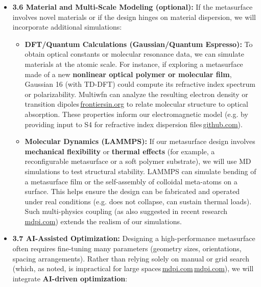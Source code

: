 \documentclass[11pt]{article}
\begin{document}
\begin{itemize}
\begin{itemize}[leftmargin=2em]
  \end{itemize}
  \item \textbf{3.6 Material and Multi-Scale Modeling (optional):} If the metasurface involves novel materials or if the design hinges on material dispersion, we will incorporate additional simulations:
  \begin{itemize}[leftmargin=2em]
    \item \textbf{DFT/Quantum Calculations (Gaussian/Quantum Espresso):} To obtain optical constants or molecular resonance data, we can simulate materials at the atomic scale. For instance, if exploring a metasurface made of a new \textbf{nonlinear optical polymer or molecular film}, Gaussian 16 (with TD-DFT) could compute its refractive index spectrum or polarizability. Multiwfn can analyze the resulting electron density or transition dipoles\,\href{https://www.frontiersin.org/journals/bioengineering-and-biotechnology/articles/10.3389/fbioe.2023.1219042/full#:~:text=Progress%20in%20application%20of%20terahertz,walled%20carbon%20nanotube%20film}{frontiersin.org} to relate molecular structure to optical absorption. These properties inform our electromagnetic model (e.g. by providing input to S4 for refractive index dispersion files\,\href{https://github.com/hzzg0727/Metasurface-Design#:~:text=material}{github.com}).
    \item \textbf{Molecular Dynamics (LAMMPS):} If our metasurface design involves \textbf{mechanical flexibility} or \textbf{thermal effects} (for example, a reconfigurable metasurface or a soft polymer substrate), we will use MD simulations to test structural stability. LAMMPS can simulate bending of a metasurface film or the self-assembly of colloidal meta-atoms on a surface. This helps ensure the design can be fabricated and operated under real conditions (e.g. does not collapse, can sustain thermal loads). Such multi-physics coupling (as also suggested in recent research\,\href{https://www.mdpi.com/2304-6732/12/10/947#:~:text=diverse%2C%20rapid%2C%20and%20precise%2C%20simplifying,previously%20complex%20inverse%20design%20process}{mdpi.com}) extends the realism of our simulations.
  \end{itemize}
  \item \textbf{3.7 AI-Assisted Optimization:} Designing a high-performance metasurface often requires fine-tuning many parameters (geometry sizes, orientations, spacing arrangements). Rather than relying solely on manual or grid search (which, as noted, is impractical for large spaces\,\href{https://www.mdpi.com/2304-6732/12/10/947#:~:text=Traditional%20metasurface%20design%20methods%20mainly,simulate%20and%20analyze%20the%20electromagnetic}{mdpi.com}\,\href{https://www.mdpi.com/2304-6732/12/10/947#:~:text=performance%20metrics%20can%20be%20determined%2C,dimensional%20or%20complex%20scenarios}{mdpi.com}), we will integrate \textbf{AI-driven optimization}:

\end{itemize}
\end{document}
